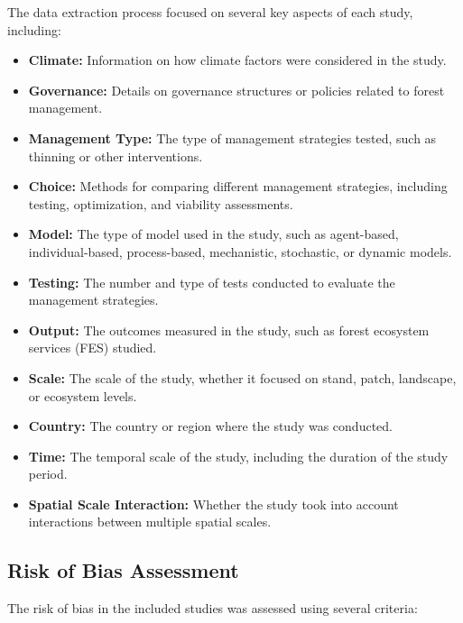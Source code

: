 \documentclass[a4paper,12pt]{article}
\begin{document}
The data extraction process focused on several key aspects of each study, including:

\begin{itemize}
    \item \textbf{Climate:} Information on how climate factors were considered in the study.
    \item \textbf{Governance:} Details on governance structures or policies related to forest management.
    \item \textbf{Management Type:} The type of management strategies tested, such as thinning or other interventions.
    \item \textbf{Choice:} Methods for comparing different management strategies, including testing, optimization, and viability assessments.
    \item \textbf{Model:} The type of model used in the study, such as agent-based, individual-based, process-based, mechanistic, stochastic, or dynamic models.
    \item \textbf{Testing:} The number and type of tests conducted to evaluate the management strategies.
    \item \textbf{Output:} The outcomes measured in the study, such as forest ecosystem services (FES) studied.
    \item \textbf{Scale:} The scale of the study, whether it focused on stand, patch, landscape, or ecosystem levels.
    \item \textbf{Country:} The country or region where the study was conducted.
    \item \textbf{Time:} The temporal scale of the study, including the duration of the study period.
    \item \textbf{Spatial Scale Interaction:} Whether the study took into account interactions between multiple spatial scales.
\end{itemize}

\subsection{Risk of Bias Assessment}
\label{sec:risk_of_bias}

The risk of bias in the included studies was assessed using several criteria:
\end{document}
